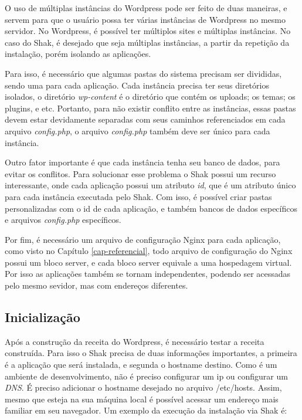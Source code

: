 O uso de múltiplas instâncias do Wordpress pode ser feito de duas maneiras, e servem
para que o usuário possa ter várias instâncias de Wordpress no mesmo servidor. No 
Wordpress, é possível ter múltiplos sites e múltiplas
instâncias. No caso do Shak, é desejado que seja múltiplas instâncias, a partir da
repetição da instalação, porém isolando as aplicações.
 
Para isso, é necessário que algumas pastas do sistema
precisam ser divididas, sendo uma para cada aplicação. Cada instância precisa
ter seus diretórios isolados, o diretório \textit{wp-content} é o diretório 
que contém os uploads; os temas; os plugins, e etc. Portanto, para não
existir conflito entre as instâncias, essas pastas devem estar devidamente separadas
com seus caminhos referenciados em cada arquivo \textit{config.php}, o arquivo 
\textit{config.php} também
deve ser único para cada instância. 

Outro fator importante é que cada instância
tenha seu banco de dados, para evitar os conflitos. Para
solucionar esse problema o Shak possui um recurso interessante, onde cada aplicação
possui um atributo \textit{id}, que é um atributo único para cada instância executada pelo
Shak. Com isso, é possível criar pastas personalizadas com o id de cada aplicação, 
e também bancos de dados específicos e arquivos \textit{config.php} específicos.

Por fim, é necessário um arquivo de configuração Nginx para cada aplicação,
como visto no Capítulo \ref{cap-referencial}, todo arquivo de configuração
do Nginx possui um bloco server, e cada bloco server equivale a uma hospedagem virtual. 
Por isso as aplicações também se tornam independentes, podendo ser acessadas pelo 
mesmo sevidor, mas com endereços diferentes.

\subsection{Inicialização}

Após a construção da receita do Wordpress, é necessário testar a receita construída. 
Para isso o Shak precisa de duas informações importantes, a primeira é a aplicação
que será instalada, e segunda o hostname destino. Como é um ambiente de desenvolvimento,
não é preciso configurar um ip ou configurar um \textit{DNS}. É preciso adicionar o
hostname desejado no arquivo /etc/hosts. Assim, mesmo que esteja na sua máquina local
é possível acessar um endereço mais familiar em seu navegador. Um exemplo da execução
da instalação via Shak é:


